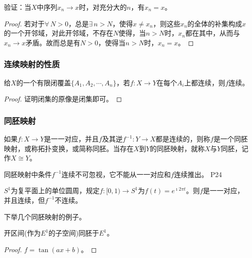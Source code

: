 \begin{proposition}
    验证：当$X$中序列$x_n\rightarrow x$时，对充分大的$n$，有$x_n=x$。
\end{proposition}

\begin{proof}
    若对于$\forall \, N>0$，总是$\exists \, n>N$，使得$x\neq x_n$，则这些$x_n$的全体的补集构成$x$的一个开邻域，对此开邻域，不存在$N$使得，当$n>N$时，$x_n$都在其中，从而与$x_n\rightarrow x$矛盾。故而总是有$N>0$，使得当$n>N$时，$x_n=x$。
\end{proof}

\subsubsection{连续映射的性质}

\begin{theorem}[粘接引理]
    给$X$的一个有限闭覆盖$\{A_1,A_2,\cdots,A_n\}$，若$f:X\rightarrow Y$在每个$A_i$上都连续，则$f$连续。
\end{theorem}

\begin{proof}
    证明闭集的原像是闭集即可。
\end{proof}

\subsubsection{同胚映射}

\begin{definition}[同胚映射]
    如果$f:X\rightarrow Y$是一一对应，并且$f$及其逆$f^{-1}:Y\rightarrow X$都是连续的，则称$f$是一个同胚映射，或称拓扑变换，或简称同胚。当存在$X$到$Y$的同胚映射，就称$X$与$Y$同胚，记作$X\cong Y$。
\end{definition}

\original
{
    同胚映射中条件$f^{-1}$连续不可忽视，它不能从一一对应和$f$连续推出。
}
{P24}

\begin{example}[反例]
    $S^{1}$为复平面上的单位圆周，规定$f:[0,1)\rightarrow S^1$为$f(t)=e^{\imath 2\pi t}$。则$f$是一一对应，并且连续，但$f^{-1}$不连续。
\end{example}

下举几个同胚映射的例子。

\begin{example}
    开区间(作为$E^1$的子空间)同胚于$E^1$。
\end{example}

\begin{proof}
    $f=\tan (ax+b)$。
\end{proof}

